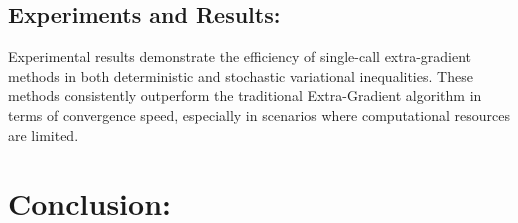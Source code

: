 \documentclass[11pt]{article}
\begin{document}
	\subsection{Experiments and Results:}
 
        Experimental results demonstrate the efficiency of single-call extra-gradient methods in both deterministic and stochastic variational inequalities. These methods consistently outperform the traditional Extra-Gradient algorithm in terms of convergence speed, especially in scenarios where computational resources are limited.
 
	
\section{Conclusion:}
\end{document}
